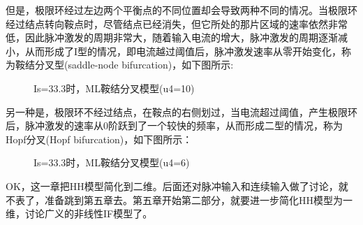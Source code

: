 \documentclass[12pt, a4paper, oneside]{ctexbook}
\begin{document}
但是，极限环经过左边两个平衡点的不同位置却会导致两种不同的情况。当极限环经过结点转向鞍点时，尽管结点已经消失，但它所处的那片区域的速率依然非常低，因此脉冲激发的周期非常大，随着输入电流的增大，脉冲激发的周期逐渐减小，从而形成了I型的情况，即电流越过阈值后，脉冲激发速率从零开始变化，称为鞍结分叉型(saddle-node bifurcation)，如下图所示:

\begin{figure}[H]
    \centering
    \caption{Is=33.3时，ML鞍结分叉模型(u4=10)}
\end{figure}

另一种是，极限环不经过结点，在鞍点的右侧划过，当电流超过阈值，产生极限环后，脉冲激发的速率从0阶跃到了一个较快的频率，从而形成二型的情况，称为Hopf分叉(Hopf bifurcation)，如下图所示：

\begin{figure}[H]
    \centering
    \caption{Is=33.3时，ML鞍结分叉模型(u4=6)}
\end{figure}

OK，这一章把HH模型简化到二维。后面还对脉冲输入和连续输入做了讨论，就不表了，准备跳到第五章去。第五章开始第二部分，就要进一步简化HH模型为一维，讨论广义的非线性IF模型了。
\end{document}
